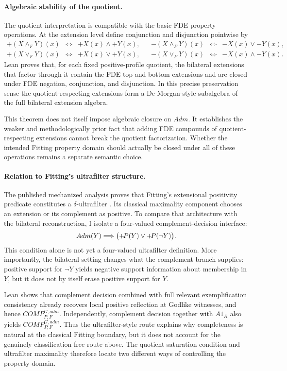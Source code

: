 \paragraph{Algebraic stability of the quotient.}
The quotient interpretation is compatible with the basic FDE property operations. At the extension level define conjunction and disjunction pointwise by
\[
\begin{array}{rclcrcl}
 +(X\wedge_FY)(x)&\Leftrightarrow&+X(x)\land+Y(x),&&
 -(X\wedge_FY)(x)&\Leftrightarrow&-X(x)\lor-Y(x),\\
 +(X\vee_FY)(x)&\Leftrightarrow&+X(x)\lor+Y(x),&&
 -(X\vee_FY)(x)&\Leftrightarrow&-X(x)\land-Y(x).
\end{array}
\]
Lean proves that, for each fixed positive-profile quotient, the bilateral extensions that factor through it contain the FDE top and bottom extensions and are closed under FDE negation, conjunction, and disjunction. In this precise preservation sense the quotient-respecting extensions form a De-Morgan-style subalgebra of the full bilateral extension algebra.

This theorem does not itself impose algebraic closure on \(Adm\). It establishes the weaker and methodologically prior fact that adding FDE compounds of quotient-respecting extensions cannot break the quotient factorization. Whether the intended Fitting property domain should actually be closed under all of these operations remains a separate semantic choice.

\paragraph{Relation to Fitting's ultrafilter structure.}
The published mechanized analysis proves that Fitting's extensional positivity predicate constitutes a \(\delta\)-ultrafilter \cite{BenzmuellerFuenmayor2019}. Its classical maximality component chooses an extension or its complement as positive. To compare that architecture with the bilateral reconstruction, I isolate a four-valued complement-decision interface:
\[
  Adm(Y)\Longrightarrow
  \bigl(+\!P(Y)\lor+\!P(\neg Y)\bigr).
\]
This condition alone is not yet a four-valued ultrafilter definition. More importantly, the bilateral setting changes what the complement branch supplies: positive support for \(\neg Y\) yields negative support information about membership in \(Y\), but it does not by itself erase positive support for \(Y\).

Lean shows that complement decision combined with full relevant exemplification consistency already recovers local positive reflection at Godlike witnesses, and hence \(COMP_{P,F}^{G,adm}\). Independently, complement decision together with \(A1_R\) also yields \(COMP_{P,F}^{G,adm}\). Thus the ultrafilter-style route explains why completeness is natural at the classical Fitting boundary, but it does not account for the genuinely classification-free route above. The quotient-saturation condition and ultrafilter maximality therefore locate two different ways of controlling the property domain.


